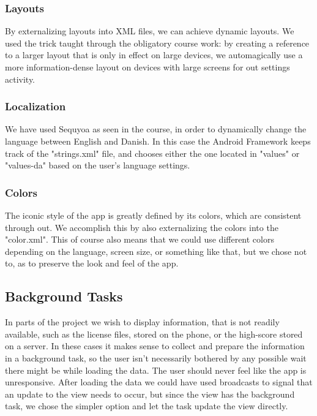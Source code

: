 \documentclass[a4paper, 12pt]{article}
\begin{document}
\subsubsection{Layouts}
By externalizing layouts into XML files, we can achieve dynamic
layouts. We used the trick taught through the obligatory course work:
by creating a reference to a larger layout that is only in effect on
large devices, we automagically use a more information-dense layout on
devices with large screens for out settings activity.

\subsubsection{Localization}
We have used Sequyoa as seen in the course, in order to dynamically
change the language between English and Danish. In this case the
Android Framework keeps track of the "strings.xml" file, and chooses
either the one located in "values" or "values-da" based on the user's
language settings.

\subsubsection{Colors}
The iconic style of the app is greatly defined by its colors, which
are consistent through out. We accomplish this by also externalizing
the colors into the "color.xml". This of course also means that we
could use different colors depending on the language, screen size, or
something like that, but we chose not to, as to preserve the look and
feel of the app.

\subsection{Background Tasks}
In parts of the project we wish to display information, that is not
readily available, such as the license files, stored on the phone, or
the high-score stored on a server. In these cases it makes sense to
collect and prepare the information in a background task, so the user
isn't necessarily bothered by any possible wait there might be while
loading the data. The user should never feel like the app is
unresponsive. After loading the data we could have used broadcasts to
signal that an update to the view needs to occur, but since the view
has the background task, we chose the simpler option and let the task
update the view directly.

\end{document}
